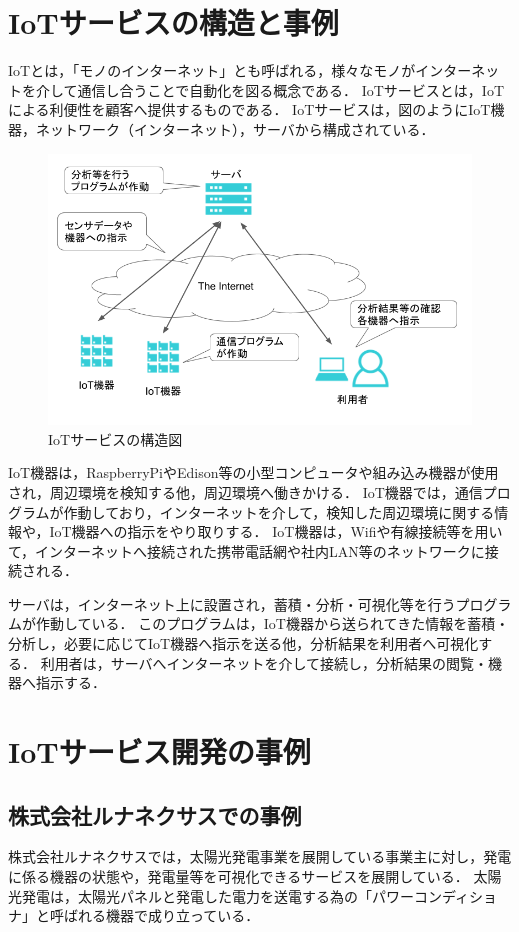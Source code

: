 \section{IoTサービスの構造と事例}
IoTとは，「モノのインターネット」とも呼ばれる，様々なモノがインターネットを介して通信し合うことで自動化を図る概念である．
IoTサービスとは，IoTによる利便性を顧客へ提供するものである．
IoTサービスは，図のようにIoT機器，ネットワーク（インターネット），サーバから構成されている．
\begin{figure}[htbp]
\includegraphics[width=16cm]{images/IoTstract.png}
\caption{IoTサービスの構造図}
\label{fig:iotstract}
\end{figure}

IoT機器は，RaspberryPiやEdison等の小型コンピュータや組み込み機器が使用され，周辺環境を検知する他，周辺環境へ働きかける．
IoT機器では，通信プログラムが作動しており，インターネットを介して，検知した周辺環境に関する情報や，IoT機器への指示をやり取りする．
IoT機器は，Wifiや有線接続等を用いて，インターネットへ接続された携帯電話網や社内LAN等のネットワークに接続される．
\medskip

サーバは，インターネット上に設置され，蓄積・分析・可視化等を行うプログラムが作動している．
このプログラムは，IoT機器から送られてきた情報を蓄積・分析し，必要に応じてIoT機器へ指示を送る他，分析結果を利用者へ可視化する．
利用者は，サーバへインターネットを介して接続し，分析結果の閲覧・機器へ指示する．

\section{IoTサービス開発の事例}

\subsection{株式会社ルナネクサスでの事例}
株式会社ルナネクサスでは，太陽光発電事業を展開している事業主に対し，発電に係る機器の状態や，発電量等を可視化できるサービスを展開している．
太陽光発電は，太陽光パネルと発電した電力を送電する為の「パワーコンディショナ」と呼ばれる機器で成り立っている．
\medskip

